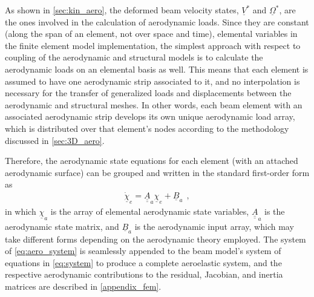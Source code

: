 \documentclass[12pt,a4paper,oneside,english]{abntex2} %
\newcommand{\vect}[1]{\underline{#1}}
\def\tens#1{\underline{\underline{#1}}}
\def\V{\vect{V}}
\def\Vs{\V^{*}}
\def\Om{\vect{\Omega}}
\def\Oms{\Om^{*}}
\def\aerostates{\vect{\chi}_e}
\def\aerostatesrates{\vect{\dot{\chi}}_e}
\begin{document}
As shown in \cref{sec:kin_aero}, the deformed beam velocity states, $\Vs$ and $\Oms$, are the ones involved in the calculation of aerodynamic loads. Since they are constant (along the span of an element, not over space and time), elemental variables in the finite element model implementation, the simplest approach with respect to coupling of the aerodynamic and structural models is to calculate the aerodynamic loads on an elemental basis as well. This means that each element is assumed to have one aerodynamic strip associated to it, and no interpolation is necessary for the transfer of generalized loads and displacements between the aerodynamic and structural meshes. In other words, each beam element with an associated aerodynamic strip develops its own unique aerodynamic load array, which is distributed over that element's nodes according to the methodology discussed in \cref{sec:3D_aero}.

Therefore, the aerodynamic state equations for each element (with an attached aerodynamic surface) can be grouped and written in the standard first-order form as
\begin{align}
    \aerostatesrates = \tens{A}_a \aerostates + \vect{B}_a \ \ ,
    \label{eq:aero_system}
\end{align}
in which $\vect{\chi}_a$ is the array of elemental aerodynamic state variables, $\tens{A}_a$ is the aerodynamic state matrix, and $\vect{B}_a$ is the aerodynamic input array, which may take different forms depending on the aerodynamic theory employed. The system of \cref{eq:aero_system} is seamlessly appended to the beam model's system of equations in \cref{eq:system} to produce a complete aeroelastic system, and the respective aerodynamic contributions to the residual, Jacobian, and inertia matrices are described in \cref{appendix_fem}.
\end{document}
